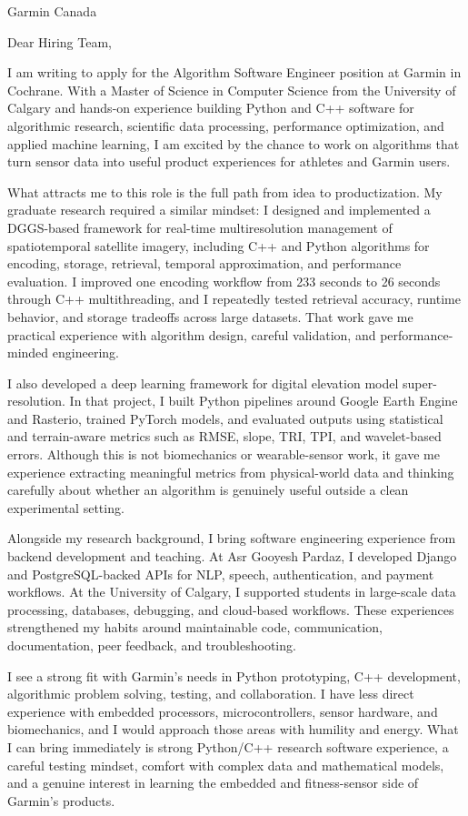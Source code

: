 \documentclass[11pt]{letter}
\begin{document}
\begin{letter}{Garmin Canada}

\opening{Dear Hiring Team,}

I am writing to apply for the Algorithm Software Engineer position at Garmin in Cochrane. With a Master of Science in Computer Science from the University of Calgary and hands-on experience building Python and C++ software for algorithmic research, scientific data processing, performance optimization, and applied machine learning, I am excited by the chance to work on algorithms that turn sensor data into useful product experiences for athletes and Garmin users.

What attracts me to this role is the full path from idea to productization. My graduate research required a similar mindset: I designed and implemented a DGGS-based framework for real-time multiresolution management of spatiotemporal satellite imagery, including C++ and Python algorithms for encoding, storage, retrieval, temporal approximation, and performance evaluation. I improved one encoding workflow from 233 seconds to 26 seconds through C++ multithreading, and I repeatedly tested retrieval accuracy, runtime behavior, and storage tradeoffs across large datasets. That work gave me practical experience with algorithm design, careful validation, and performance-minded engineering.

I also developed a deep learning framework for digital elevation model super-resolution. In that project, I built Python pipelines around Google Earth Engine and Rasterio, trained PyTorch models, and evaluated outputs using statistical and terrain-aware metrics such as RMSE, slope, TRI, TPI, and wavelet-based errors. Although this is not biomechanics or wearable-sensor work, it gave me experience extracting meaningful metrics from physical-world data and thinking carefully about whether an algorithm is genuinely useful outside a clean experimental setting.

Alongside my research background, I bring software engineering experience from backend development and teaching. At Asr Gooyesh Pardaz, I developed Django and PostgreSQL-backed APIs for NLP, speech, authentication, and payment workflows. At the University of Calgary, I supported students in large-scale data processing, databases, debugging, and cloud-based workflows. These experiences strengthened my habits around maintainable code, communication, documentation, peer feedback, and troubleshooting.

I see a strong fit with Garmin's needs in Python prototyping, C++ development, algorithmic problem solving, testing, and collaboration. I have less direct experience with embedded processors, microcontrollers, sensor hardware, and biomechanics, and I would approach those areas with humility and energy. What I can bring immediately is strong Python/C++ research software experience, a careful testing mindset, comfort with complex data and mathematical models, and a genuine interest in learning the embedded and fitness-sensor side of Garmin's products.


\end{letter}
\end{document}
